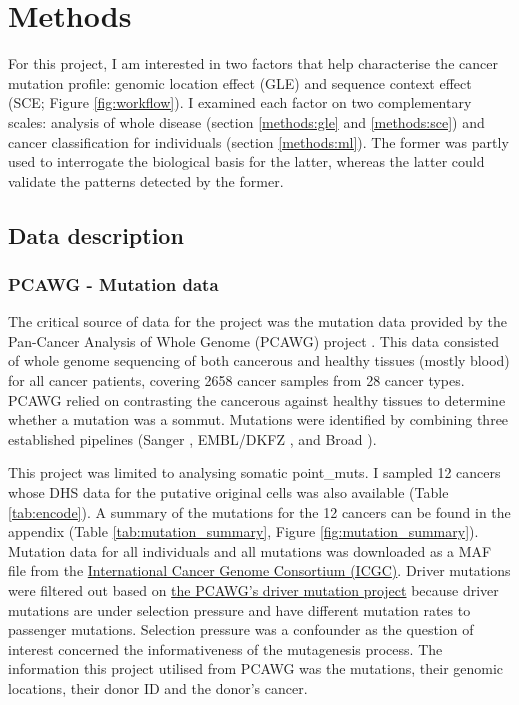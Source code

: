 \chapter{Methods}\label{methods}

For this project, I am interested in two factors that help characterise the cancer mutation profile: genomic location effect (GLE) and sequence context effect (SCE; Figure \ref{fig:workflow}). I examined each factor on two complementary scales: analysis of whole disease (section \ref{methods:gle} and \ref{methods:sce}) and cancer classification for individuals (section \ref{methods:ml}). The former was partly used to interrogate the biological basis for the latter, whereas the latter could validate the patterns detected by the former.



\section{Data description}
\subsection{PCAWG - Mutation data} 
The critical source of data for the project was the mutation data provided by the Pan-Cancer Analysis of Whole Genome (PCAWG) project \citep{Campbell2020}. This data consisted of whole genome sequencing of both cancerous and healthy tissues (mostly blood) for all cancer patients, covering 2658 cancer samples from 28 cancer types. PCAWG relied on contrasting the cancerous against healthy tissues to determine whether a mutation was a \gls{sommut}. Mutations were identified by combining three established pipelines (Sanger \citep{Jones2016CgpCaVEManWrapper:Data}, EMBL/DKFZ \citep{Rimmer2014IntegratingApplications}, and Broad \citep{Cibulskis2013SensitiveSamples}).

This project was limited to analysing somatic \glspl{point_mut}. I sampled 12 cancers whose DHS data for the putative original cells was also available (Table \ref{tab:encode}). A summary of the mutations for the 12 cancers can be found in the appendix (Table \ref{tab:mutation_summary}, Figure \ref{fig:mutation_summary}). Mutation data for all individuals and all mutations was downloaded as a MAF file from the \href{https://dcc.icgc.org/releases/PCAWG/consensus_snv_indel}{International Cancer Genome Consortium (ICGC)}. Driver mutations were filtered out based on \href{https://dcc.icgc.org/releases/PCAWG/driver_mutations}{the PCAWG's driver mutation project} because driver mutations are under selection pressure and have different mutation rates to passenger mutations. Selection pressure was a confounder as the question of interest concerned the informativeness of the mutagenesis process. The information this project utilised from PCAWG was the mutations, their genomic locations, their donor ID and the donor's cancer. 

